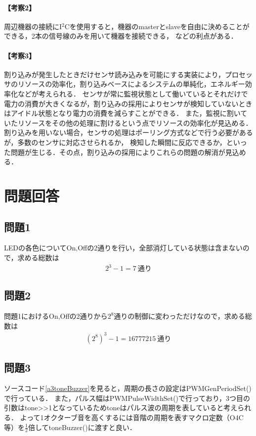 \documentclass{jlreq}
\begin{document}
\paragraph{【考察2】}周辺機器の接続にI$^2$Cを使用すると，機器のmasterとslaveを自由に決めることができる，2本の信号線のみを用いて機器を接続できる，
などの利点がある．~\cite{ti}
\paragraph{【考察3】}割り込みが発生したときだけセンサ読み込みを可能にする実装により，プロセッサのリソースの効率化，割り込みベースによるシステムの単純化，エネルギー効率化などが考えられる．
センサが常に監視状態として働いているとそれだけで電力の消費が大きくなるが，割り込みの採用によりセンサが検知していないときはアイドル状態となり電力の消費を減らすことができる．
また，監視に割いていたリソースをその他の処理に割けるという点でリソースの効率化が見込める．割り込みを用いない場合，センサの処理はポーリング方式などで行う必要があるが，多数のセンサに対応させられるか，
検知した瞬間に反応できるか，といった問題が生じる．その点，割り込みの採用によりこれらの問題の解消が見込める．

\section{問題回答}
\subsection{問題1}
LEDの各色についてOn,Offの2通りを行い，全部消灯している状態は含まないので，求める総数は
\begin{align*}
  2^3-1=7\ 通り
\end{align*}

\subsection{問題2}
問題1におけるOn,Offの2通りから$2^8$通りの制御に変わっただけなので，求める総数は
\begin{align*}
  (2^8)^3-1=16777215\ 通り
\end{align*}

\subsection{問題3}
ソースコード\ref{a3toneBuzzer}を見ると，周期の長さの設定はPWMGenPeriodSet()で行っている．
また，パルス幅はPWMPulseWidthSet()で行っており，3つ目の引数はtone>>1となっているためtoneはパルス波の周期を表していると考えられる．
よって1オクターブ音を高くするには音階の周期を表すマクロ定数（O4C等）を$\frac{1}{2}$倍してtoneBuzzer()に渡すと良い．
\end{document}
